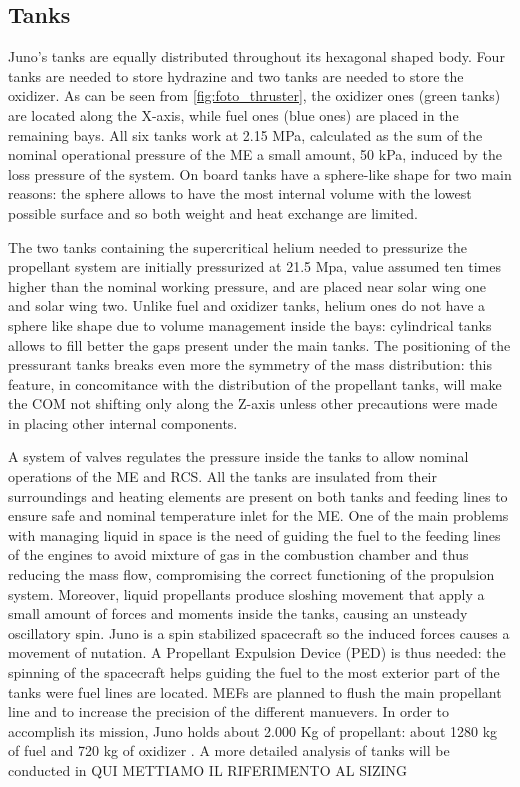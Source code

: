 
\subsection{Tanks} 
\label{sec: tanks}
Juno's tanks are equally distributed throughout its hexagonal shaped body. Four tanks are needed to store hydrazine and two tanks are needed to store the oxidizer. As can be seen from \autoref{fig:foto_thruster}, the oxidizer ones (green tanks) are located along the X-axis, while fuel ones (blue ones) are placed in the remaining bays. All six tanks work at 2.15 MPa, calculated as the sum of the nominal operational pressure of the ME a small amount, 50 kPa, induced by the loss pressure of the system\cite{Leros}. On board tanks have a sphere-like shape for two main reasons: the sphere allows to have the most internal volume with the lowest possible surface and so both weight and heat exchange are limited.

The two tanks\cite{2tankshe} containing the supercritical helium needed to pressurize the propellant system are initially pressurized at 21.5 Mpa, value assumed ten times higher than the nominal working pressure, and are placed near solar wing one and solar wing two. Unlike fuel and oxidizer tanks, helium ones do not have a sphere like shape due to volume management inside the bays\cite{he_tank}: cylindrical tanks allows to fill better the gaps present under the main tanks. The positioning of the pressurant tanks breaks even more the symmetry of the mass distribution: this feature, in concomitance with the distribution of the propellant tanks, will make the COM not shifting only along the Z-axis unless other precautions were made in placing other internal components. 

A system of valves regulates the pressure inside the tanks to allow nominal operations of the ME and RCS. All the tanks are insulated from their surroundings and heating elements are present on both tanks and feeding lines to ensure safe and nominal temperature inlet for the ME\cite{Leros}.
One of the main problems with managing liquid in space is the need of guiding the fuel to the feeding lines of the engines to avoid mixture of gas in the combustion chamber and thus reducing the mass flow, compromising the correct functioning of the propulsion system. Moreover, liquid propellants produce sloshing movement that apply a small amount of forces and moments inside the tanks, causing an unsteady oscillatory spin. Juno is a spin stabilized spacecraft so the induced forces causes a movement of nutation. A Propellant Expulsion Device (PED) is thus needed: the spinning of the spacecraft helps guiding the fuel to the most exterior part of the tanks were fuel lines are located\cite{slosh}. 
MEFs are planned to flush the main propellant line and to increase the precision of the different manuevers. 
In order to accomplish its mission, Juno holds about 2.000 Kg of propellant: about 1280 kg of fuel and 720 kg of oxidizer \cite{junno_inner}. A more detailed analysis of tanks will be conducted in QUI METTIAMO IL RIFERIMENTO AL SIZING
 











